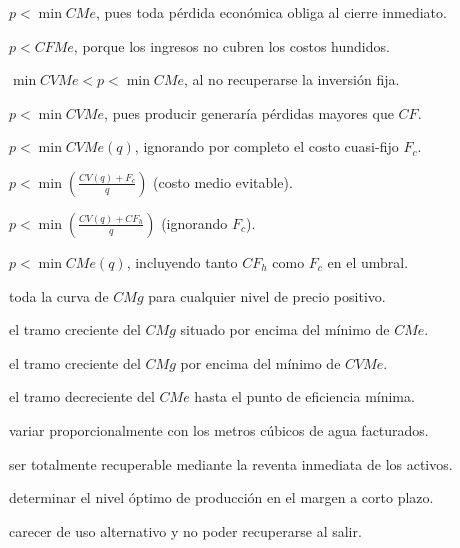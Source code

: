 \begin{opts}
    \item $p < \min CMe$, pues toda pérdida económica obliga al cierre inmediato.
    \item $p < CFMe$, porque los ingresos no cubren los costos hundidos.
    \item $\min CVMe < p < \min CMe$, al no recuperarse la inversión fija.
    \item $p < \min CVMe$, pues producir generaría pérdidas mayores que $CF$.
\end{opts}

\begin{opts}
    \item $p < \min CVMe(q)$, ignorando por completo el costo cuasi-fijo $F_c$.
    \item $p < \min \left(\frac{CV(q) + F_c}{q}\right)$ (costo medio evitable).
    \item $p < \min \left(\frac{CV(q) + CF_h}{q}\right)$ (ignorando $F_c$).
    \item $p < \min CMe(q)$, incluyendo tanto $CF_h$ como $F_c$ en el umbral.
\end{opts}

\begin{opts}
    \item toda la curva de $CMg$ para cualquier nivel de precio positivo.
    \item el tramo creciente del $CMg$ situado por encima del mínimo de $CMe$.
    \item el tramo creciente del $CMg$ por encima del mínimo de $CVMe$.
    \item el tramo decreciente del $CMe$ hasta el punto de eficiencia mínima.
\end{opts}

\begin{opts}
    \item variar proporcionalmente con los metros cúbicos de agua facturados.
    \item ser totalmente recuperable mediante la reventa inmediata de los activos.
    \item determinar el nivel óptimo de producción en el margen a corto plazo.
    \item carecer de uso alternativo y no poder recuperarse al salir.
\end{opts}

